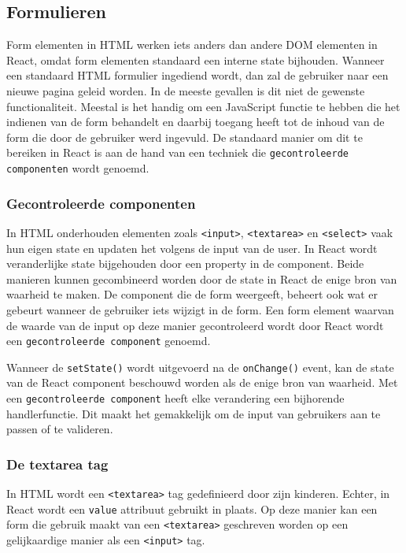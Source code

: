 \subsection{Formulieren}

Form elementen in HTML werken iets anders dan andere DOM elementen in React, omdat form elementen standaard een interne state bijhouden. Wanneer een standaard HTML formulier ingediend wordt, dan zal de gebruiker naar een nieuwe pagina geleid worden. In de meeste gevallen is dit niet de gewenste functionaliteit. Meestal is het handig om een JavaScript functie te hebben die het indienen van de form behandelt en daarbij toegang heeft tot de inhoud van de form die door de gebruiker werd ingevuld. De standaard manier om dit te bereiken in React is aan de hand van een techniek die \texttt{gecontroleerde componenten} wordt genoemd. \autocite{React2019i}

\subsubsection{Gecontroleerde componenten}

In HTML onderhouden elementen zoals \texttt{<input>}, \texttt{<textarea>} en \texttt{<select>} vaak hun eigen state en updaten het volgens de input van de user. In React wordt veranderlijke state bijgehouden door een property in de component. Beide manieren kunnen gecombineerd worden door de state in React de enige bron van waarheid te maken. De component die de form weergeeft, beheert ook wat er gebeurt wanneer de gebruiker iets wijzigt in de form. Een form element waarvan de waarde van de input op deze manier gecontroleerd wordt door React wordt een \texttt{gecontroleerde component} genoemd. \autocite{React2019i}

Wanneer de \texttt{setState()} wordt uitgevoerd na de \texttt{onChange()} event, kan de state van de React component beschouwd worden als de enige bron van waarheid. Met een \texttt{gecontroleerde component} heeft elke verandering een bijhorende handlerfunctie. Dit maakt het gemakkelijk om de input van gebruikers aan te passen of te valideren.  \autocite{React2019i}

\subsubsection{De textarea tag}

In HTML wordt een \texttt{<textarea>} tag gedefinieerd door zijn kinderen. Echter, in React wordt een \texttt{value} attribuut gebruikt in plaats. Op deze manier kan een form die gebruik maakt van een \texttt{<textarea>} geschreven worden op een gelijkaardige manier als een \texttt{<input>} tag. \autocite{React2019i}

